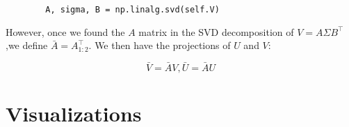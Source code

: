 \documentclass{article}
\begin{document}
\begin{verbatim}
        A, sigma, B = np.linalg.svd(self.V)
\end{verbatim}

\noindent However, once we found the $A$ matrix in the SVD decomposition of $V = A
\Sigma B^{\intercal}$,we define $\bar{A} = A_{1:2}^{\intercal}$. We then have
the projections of $U$ and $V$:

$$ \bar{V} = \bar{A} V, \bar{U} = \bar{A} U $$

\section*{Visualizations}
\end{document}
